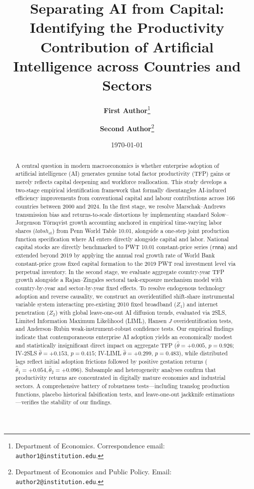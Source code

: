\documentclass[11pt,a4paper]{article}
\title{\textbf{Separating AI from Capital: Identifying the Productivity Contribution of Artificial Intelligence across Countries and Sectors}}
\author{
  \textbf{First Author}\thanks{Department of Economics. Correspondence email: \texttt{author1@institution.edu}.}
  \and
  \textbf{Second Author}\thanks{Department of Economics and Public Policy. Email: \texttt{author2@institution.edu}.}
}
\date{\today}
\begin{document}
\maketitle

\begin{abstract}
\noindent A central question in modern macroeconomics is whether enterprise adoption of artificial intelligence (AI) generates genuine total factor productivity (TFP) gains or merely reflects capital deepening and workforce reallocation. This study develops a two-stage empirical identification framework that formally disentangles AI-induced efficiency improvements from conventional capital and labour contributions across 166 countries between 2000 and 2024. In the first stage, we resolve Marschak--Andrews transmission bias and returns-to-scale distortions by implementing standard Solow--Jorgenson Törnqvist growth accounting anchored in empirical time-varying labor shares ($labsh_{ct}$) from Penn World Table 10.01, alongside a one-step joint production function specification where AI enters directly alongside capital and labor. National capital stocks are directly benchmarked to PWT 10.01 constant-price series (\texttt{rnna}) and extended beyond 2019 by applying the annual real growth rate of World Bank constant-price gross fixed capital formation to the 2019 PWT real investment level via perpetual inventory. In the second stage, we evaluate aggregate country-year TFP growth alongside a Rajan--Zingales sectoral task-exposure mechanism model with country-by-year and sector-by-year fixed effects. To resolve endogenous technology adoption and reverse causality, we construct an overidentified shift-share instrumental variable system interacting pre-existing 2010 fixed broadband ($Z_1$) and internet penetration ($Z_2$) with global leave-one-out AI diffusion trends, evaluated via 2SLS, Limited Information Maximum Likelihood (LIML), Hansen $J$ overidentification tests, and Anderson--Rubin weak-instrument-robust confidence tests. Our empirical findings indicate that contemporaneous enterprise AI adoption yields an economically modest and statistically insignificant direct impact on aggregate TFP ($\hat{\theta} = +0.005$, $p = 0.926$; IV-2SLS $\hat{\theta} = +0.153$, $p = 0.415$; IV-LIML $\hat{\theta} = +0.299$, $p = 0.483$), while distributed lags reflect initial adoption frictions followed by positive gestation returns ($\hat{\theta}_1 = +0.054, \hat{\theta}_2 = +0.096$). Subsample and heterogeneity analyses confirm that productivity returns are concentrated in digitally mature economies and industrial sectors. A comprehensive battery of robustness tests---including translog production functions, placebo historical falsification tests, and leave-one-out jackknife estimations---verifies the stability of our findings.
\end{abstract}
\end{document}
